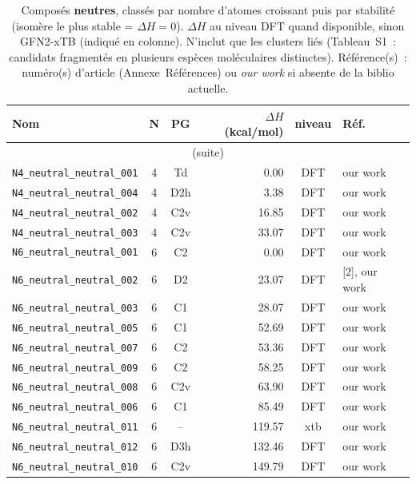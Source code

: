 {\scriptsize
\begin{longtable}{@{}p{4.7cm}ccrcp{1.6cm}@{}}
\caption{Compos\'es \textbf{neutres}, class\'es par nombre d'atomes croissant puis par stabilit\'e (isom\`ere le plus stable = $\Delta H=0$). $\Delta H$ au niveau DFT quand disponible, sinon GFN2-xTB (indiqu\'e en colonne). N'inclut que les clusters li\'es (Tableau~S1~: candidats fragment\'es en plusieurs esp\`eces mol\'eculaires distinctes). R\'ef\'erence(s)~: num\'ero(s) d'article (Annexe~R\'ef\'erences) ou \emph{our work} si absente de la biblio actuelle.}
\label{tab:provenance-neutral}\\
\toprule
\textbf{Nom} & \textbf{N} & \textbf{PG} & \textbf{$\Delta H$ (kcal/mol)} & \textbf{niveau} & \textbf{R\'ef.} \\
\midrule\endfirsthead
\multicolumn{6}{c}{\small (suite)}\\ \toprule\endhead
\bottomrule\endfoot
\bottomrule\endlastfoot
\addlinespace
\texttt{N4\_neutral\_neutral\_001} & 4 & Td & 0.00 & DFT & our work \\
\texttt{N4\_neutral\_neutral\_004} & 4 & D2h & 3.38 & DFT & our work \\
\texttt{N4\_neutral\_neutral\_002} & 4 & C2v & 16.85 & DFT & our work \\
\texttt{N4\_neutral\_neutral\_003} & 4 & C2v & 33.07 & DFT & our work \\
\addlinespace
\texttt{N6\_neutral\_neutral\_001} & 6 & C2 & 0.00 & DFT & our work \\
\texttt{N6\_neutral\_neutral\_002} & 6 & D2 & 23.07 & DFT & [2], our work \\
\texttt{N6\_neutral\_neutral\_003} & 6 & C1 & 28.07 & DFT & our work \\
\texttt{N6\_neutral\_neutral\_005} & 6 & C1 & 52.69 & DFT & our work \\
\texttt{N6\_neutral\_neutral\_007} & 6 & C2 & 53.36 & DFT & our work \\
\texttt{N6\_neutral\_neutral\_009} & 6 & C2 & 58.25 & DFT & our work \\
\texttt{N6\_neutral\_neutral\_008} & 6 & C2v & 63.90 & DFT & our work \\
\texttt{N6\_neutral\_neutral\_006} & 6 & C1 & 85.49 & DFT & our work \\
\texttt{N6\_neutral\_neutral\_011} & 6 & -- & 119.57 & xtb & our work \\
\texttt{N6\_neutral\_neutral\_012} & 6 & D3h & 132.46 & DFT & our work \\
\texttt{N6\_neutral\_neutral\_010} & 6 & C2v & 149.79 & DFT & our work \\

\end{longtable}}
